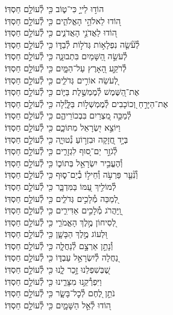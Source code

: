\documentclass[twoside, openany, parskip=half, 11pt]{book}
\begin{document}
\begin{narrow}
הוֹד֣וּ לַייָ֣ כִּי־ט֑וֹב \hfill
כִּ֖י לְ֯עוֹלָ֣ם חַסְדּֽוֹ׃\\
ה֭וֹדוּ לֵאלֹהֵ֣י הָאֱלֹהִ֑ים \hfill כִּ֖י לְ֯עוֹלָ֣ם חַסְדּֽוֹ׃\\
ה֭וֹדוּ לַאֲדֹנֵ֣י הָאֲדֹנִ֑ים \hfill כִּ֖י לְ֯עוֹלָ֣ם חַסְדּֽוֹ׃\\
לְ֯עֹ֘שֵׂ֤ה נִפְלָא֣וֹת גְּדֹל֣וֹת לְ֯בַדּ֑וֹ \hfill כִּ֖י לְ֯עוֹלָ֣ם חַסְדּֽוֹ׃\\
לְ֯עֹשֵׂ֣ה הַ֭שָּׁמַיִם בִּתְבוּנָ֑ה \hfill כִּ֖י לְ֯עוֹלָ֣ם חַסְדּֽוֹ׃\\
לְ֯רֹקַ֣ע הָ֭אָרֶץ עַל־הַמָּ֑יִם \hfill כִּ֖י לְ֯עוֹלָ֣ם חַסְדּֽוֹ׃\\
לְ֭עֹשֵׂה אוֹרִ֣ים גְּדֹלִ֑ים \hfill כִּ֖י לְ֯עוֹלָ֣ם חַסְדּֽוֹ׃\\
אֶת־הַ֭שֶּׁמֶשׁ לְ֯מֶמְשֶׁ֣לֶת בַּיּ֑וֹם \hfill כִּ֖י לְ֯עוֹלָ֣ם חַסְדּֽוֹ׃\\
אֶת־הַיָּרֵ֣חַ וְ֭כוֹכָבִים \hfill\break לְ֯מֶמְשְׁל֣וֹת בַּלָּ֑יְ֯לָה \hfill כִּ֖י לְ֯עוֹלָ֣ם חַסְדּֽוֹ׃\\
לְ֯מַכֵּ֣ה מִ֭צְרַיִם בִּבְכוֹרֵיהֶ֑ם \hfill כִּ֖י לְ֯עוֹלָ֣ם חַסְדּֽוֹ׃\\
וַיּוֹצֵ֣א יִ֭שְׂרָאֵל מִתּוֹכָ֑ם \hfill כִּ֖י לְ֯עוֹלָ֣ם חַסְדּֽוֹ׃\\
בְּיָ֣ד חֲ֭זָקָה וּבִזְר֣וֹעַ נְ֯טוּיָ֑ה \hfill כִּ֖י לְ֯עוֹלָ֣ם חַסְדּֽוֹ׃\\
לְ֯גֹזֵ֣ר יַם־ס֭וּף לִגְזָרִ֑ים \hfill כִּ֖י לְ֯עוֹלָ֣ם חַסְדּֽוֹ׃\\
וְ֯הֶעֱבִ֣יר יִשְׂרָאֵ֣ל בְּתוֹכ֑וֹ \hfill כִּ֖י לְ֯עוֹלָ֣ם חַסְדּֽוֹ׃\\
וְ֯נִ֘עֵ֤ר פַּרְעֹ֣ה וְ֯חֵיל֣וֹ בְ֯יַם־ס֑וּף \hfill כִּ֖י לְ֯עוֹלָ֣ם חַסְדּֽוֹ׃\\
לְ֯מוֹלִ֣יךְ עַ֭מּוֹ בַּמִּדְבָּ֑ר \hfill כִּ֖י לְ֯עוֹלָ֣ם חַסְדּֽוֹ׃\\
לְ֭מַכֵּה מְ֯לָכִ֣ים גְּדֹלִ֑ים \hfill כִּ֖י לְ֯עוֹלָ֣ם חַסְדּֽוֹ׃\\
וַֽ֭יַּהֲרֹג מְ֯לָכִ֣ים אַדִּירִ֑ים \hfill כִּ֖י לְ֯עוֹלָ֣ם חַסְדּֽוֹ׃\\
לְ֭סִיחוֹן מֶ֣לֶךְ הָאֱמֹרִ֑י \hfill כִּ֖י לְ֯עוֹלָ֣ם חַסְדּֽוֹ׃\\
וּ֭לְעוֹג מֶ֣לֶךְ הַבָּשָׁ֑ן \hfill כִּ֖י לְ֯עוֹלָ֣ם חַסְדּֽוֹ׃\\
וְ֯נָתַ֣ן אַרְצָ֣ם לְ֯נַחֲלָ֑ה \hfill כִּ֖י לְ֯עוֹלָ֣ם חַסְדּֽוֹ׃\\
נַ֭חֲלָה לְ֯יִשְׂרָאֵ֣ל עַבְדּ֑וֹ \hfill כִּ֖י לְ֯עוֹלָ֣ם חַסְדּֽוֹ׃\\
שֶׁ֭בְּשִׁפְלֵנוּ זָ֣כַר לָ֑נוּ \hfill כִּ֖י לְ֯עוֹלָ֣ם חַסְדּֽוֹ׃\\
וַיִּפְרְ֯קֵ֥נוּ מִצָּרֵ֑ינוּ \hfill כִּ֖י לְ֯עוֹלָ֣ם חַסְדּֽוֹ׃\\
נֹתֵ֣ן לֶ֭חֶם לְ֯כׇל־בָּשָׂ֑ר \hfill כִּ֖י לְ֯עוֹלָ֣ם חַסְדּֽוֹ׃\\
ה֭וֹדוּ לְ֯אֵ֣ל הַשָּׁמָ֑יִם \hfill כִּ֖י לְ֯עוֹלָ֣ם חַסְדּֽוֹ׃\\



\end{narrow}
\end{document}
